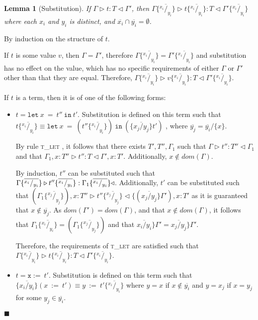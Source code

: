 \documentclass{article}
\newtheorem{lem}{Lemma}
\newcommand{\tlet}{\textsc{t\_let} }
\newcommand{\typerule}[4]{#1 \triangleright #2 : #3 \triangleleft #4}
\newcommand{\subst}[3]{#3 \{\overline{^{#1}/_{#2}}\}}
\newcommand{\lett}[3]{\mathtt{let}\:#1\:\mathtt{=}\:#2\:\mathtt{in}\:#3}
\newcommand{\qed}{$\blacksquare$}
\newenvironment{proof}{\vspace{1ex}\noindent{\bf Proof}\hspace{0.5em}}
  {\hfill\qed\vspace{1ex}}
\begin{document}
\begin{lem}[Substitution]
If $\typerule{\Gamma}{t}{T}{\Gamma'}$, then
$\typerule
{\subst{x_i}{y_i}{\Gamma}}
{\subst{x_i}{y_i}{t}}
{T}
{\subst{x_i}{y_i}{\Gamma'}}$
where each $x_i$ and $y_i$ is distinct, and $\overline{x_i} \cap \overline{y_i} = \emptyset$.
\end{lem}
\begin{proof}
By induction on the structure of $t$.

If $t$ is some value $v$, then $\Gamma = \Gamma'$, therefore
$\subst{x_i}{y_i}{\Gamma} = \subst{x_i}{y_i}{\Gamma'}$
and substitution has no effect on the value, which has no specific requirements
of either $\Gamma$ or $\Gamma'$ other than that they are equal.
Therefore, $\typerule{\subst{x_i}{y_i}{\Gamma}}{\subst{x_i}{y_i}{v}}{T}{\subst{x_i}{y_i}{\Gamma'}}$.

If $t$ is a term, then it is of one of the following forms:

\begin{itemize}
\item $t = \lett{x}{t''}{t'}$. 
Substitution is defined on this term such that
$\subst{x_i}{y_i}{t} \equiv 
\lett{x}{( \subst{x_i}{y_i}{t''} )}{(\{ \overline{x_j / y_j} \}t')}$
, where $\overline{y_j} = \overline{y_i} / \{ x \}$.

By rule \tlet, it follows
that there exists $T', T'', \Gamma_1$ such that
$\typerule{\Gamma}{t''}{T''}{\Gamma_1}$ and that
$\typerule{\Gamma_1, x : T''}{t''}{T}{\Gamma', x : T'}$.
Additionally, $x \notin dom(\Gamma)$.

By induction, $t''$ can be substituted such that 
$\typerule
{\subst{x_i}{y_i}{\Gamma}}
{\subst{x_i}{y_i}{t''}}
{\subst{x_i}{y_i}{\Gamma_1}}
$.
Additionally, $t'$ can be substituted such that
$(\subst{x_j}{y_j}{\Gamma_1}) , x : T'' \triangleright \subst{x_j}{y_j}{t''} \triangleleft \{ (\overline{x_j / y_j} \} \Gamma') , x : T'$ as it is guaranteed that $x \notin \overline{y_j}$.
As $dom(\Gamma') = dom(\Gamma)$, and that $x \notin dom(\Gamma)$, it follows that $\subst{x_i}{y_i}{\Gamma_1} = (\subst{x_j}{y_j}{\Gamma_1})$ and
that $\overline{x_i / y_i} \} \Gamma' = \overline{x_j / y_j} \} \Gamma'$.

Therefore, the requirements of \tlet are satisfied such that
$\typerule{\subst{x_i}{y_i}{\Gamma}}{\subst{x_i}{y_i}{t}}{T}{\subst{x_i}{y_i}{\Gamma'}}$.

\item $t = \mathtt{x :=\:}t'$. 
Substitution is defined on this term such that
$\{ \overline{x_i / y_i} \} ( x\::=\:t' ) \equiv y\::=\: \subst{x_i}{y_i}{t'}$
where $y = x$ if $x \notin \overline{y_i}$ and $y = x_j$ if
$x = y_j$ for some $y_j \in \overline{y_i}$.


\end{itemize}
\end{proof}
\end{document}
